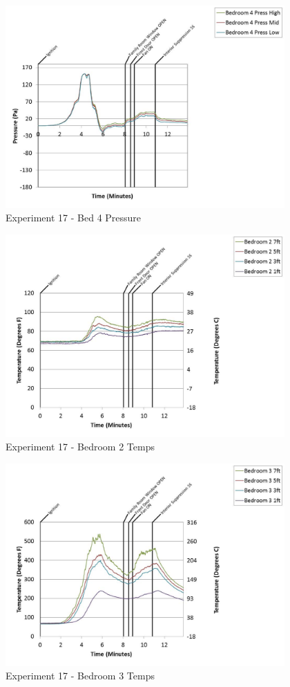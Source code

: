 \documentclass{article}
\begin{document}
\begin{appendices}
	\clearpage

	\begin{figure}[h!]
		\centering
		\includegraphics[height=3.05in]{0_Images/Results_Charts/Exp_17_Charts/Bed4Pressure.pdf}
		\caption{Experiment 17 - Bed 4 Pressure}
	\end{figure}
 

	\begin{figure}[h!]
		\centering
		\includegraphics[height=3.05in]{0_Images/Results_Charts/Exp_17_Charts/Bedroom2Temps.pdf}
		\caption{Experiment 17 - Bedroom 2 Temps}
	\end{figure}
 
	\clearpage

	\begin{figure}[h!]
		\centering
		\includegraphics[height=3.05in]{0_Images/Results_Charts/Exp_17_Charts/Bedroom3Temps.pdf}
		\caption{Experiment 17 - Bedroom 3 Temps}
	\end{figure}
 


\end{appendices}
\end{document}
